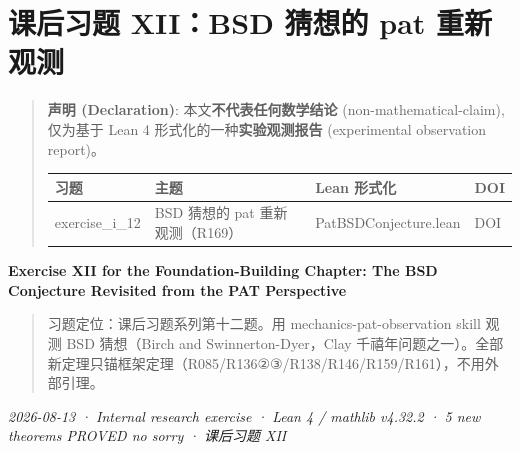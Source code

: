 \documentclass[
]{article}
\author{}
\date{}
\newcounter{none} %
\begin{document}
\section{课后习题 XII：BSD 猜想的 pat
重新观测}\label{ux7b51ux57faux7bc7ux8bfeux540eux4e60ux9898-xiibsd-ux731cux60f3ux7684-pat-ux91cdux65b0ux89c2ux6d4b}

\begin{quote}
\textbf{声明 (Declaration)}: 本文\textbf{不代表任何数学结论}
(non-mathematical-claim), 仅为基于 Lean 4
形式化的一种\textbf{实验观测报告} (experimental observation report)。

{\def\LTcaptype{none} %
\begin{longtable}[]{@{}
 >{\raggedright\arraybackslash}p{}
 >{\raggedright\arraybackslash}p{}
 >{\raggedright\arraybackslash}p{}
 >{\raggedright\arraybackslash}p{}@{}}
\toprule\noalign{}
\begin{minipage}[b]{\linewidth}\raggedright
习题
\end{minipage} & \begin{minipage}[b]{\linewidth}\raggedright
主题
\end{minipage} & \begin{minipage}[b]{\linewidth}\raggedright
Lean 形式化
\end{minipage} & \begin{minipage}[b]{\linewidth}\raggedright
DOI
\end{minipage} \\
\midrule\noalign{}
\endhead
\bottomrule\noalign{}
\endlastfoot
exercise\_i\_12 & BSD 猜想的 pat 重新观测（R169） &
PatBSDConjecture.lean & DOI \\
\end{longtable}
}
\end{quote}

\textbf{Exercise XII for the Foundation-Building Chapter: The BSD
Conjecture Revisited from the PAT Perspective}

\begin{quote}
习题定位：课后习题系列第十二题。用 mechanics-pat-observation skill
观测 BSD 猜想（Birch and Swinnerton-Dyer，Clay
千禧年问题之一）。全部新定理只锚框架定理（R085/R136②③/R138/R146/R159/R161），不用外部引理。
\end{quote}

\emph{2026-08-13 · Internal research exercise · Lean 4 / mathlib v4.32.2
· 5 new theorems PROVED no sorry · 课后习题 XII }
\end{document}
